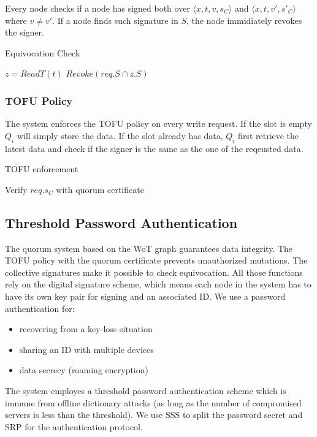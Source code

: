 \documentclass[twoside,twocolumn,10pt,fleqn]{article}
\begin{document}
Every node checks if a node has signed both over $\langle x, t, v,
s_C \rangle$
and $\langle x, t, v', s'_C \rangle$ where $v \neq v'$. If a node
finds such signature in $S$, the node immidiately revokes the signer.
\begin{algorithm}
  \caption{Equivocation Check}
  \SetAlgoNoLine
  $z = ReadT(t)$\;
  {
    $Revoke(req.S \cap z.S)$\;
  }
\end{algorithm}

\subsubsection*{TOFU Policy}
The system enforces the TOFU policy on every write request. If the
slot is empty $Q_i$ will simply store the data. If the slot already
has data, $Q_i$ first retrieve the latest data and check if the
signer is the same as the one of the reqeusted data.
\begin{algorithm}
  \caption{TOFU enforcement}
  \SetAlgoNoLine
  Verify $req.s_C$ with quorum certificate\;
\end{algorithm}

\subsection{Threshold Password Authentication}
\label{threshold}
The quorum system based on the WoT graph guarantees data
integrity. The TOFU policy with the quorum certificate prevents
unauthorized mutations. The collective signatures make it possible to
check equivocation. All those functions rely on the digital signature
scheme, which means each node in the system has to have its own key
pair for signing and an associated ID. We use a password
authentication for:
\begin{itemize}
\item recovering from a key-loss situation
\item sharing an ID with multiple devices
\item data secrecy (roaming encryption)
\end{itemize}

The system employes a threshold password authentication scheme which
is immune from offline dictionary attacks (as long as the number of
compromised servers is less than the threshold). We use SSS to split
the password secret and SRP \cite{srp} for the authentication
protocol.\\
\end{document}
